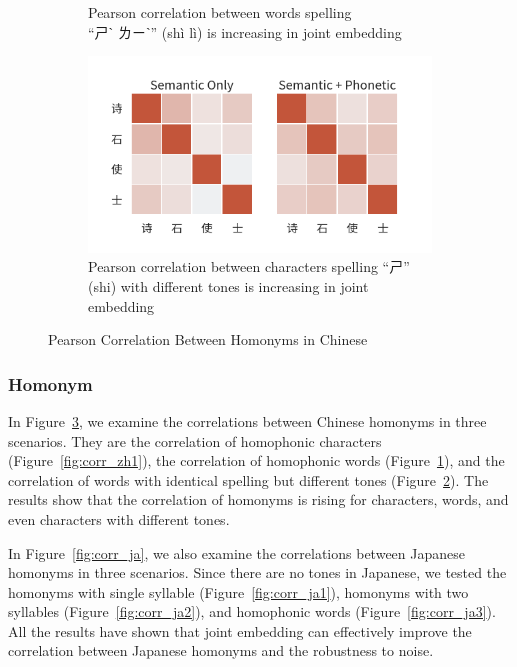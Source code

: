 \begin{figure}[t]
\begin{subfigure}[b]{0.49\textwidth}
        \caption{Pearson correlation between words spelling \\``ㄕˋ ㄌㄧˋ'' (shì lì) is increasing in joint embedding}
        \label{fig:corr_zh2}
    \end{subfigure}
    \begin{subfigure}[b]{0.49\textwidth}
        \centering
        \includegraphics[width=\textwidth]{../images/corr_zh3.png}
        \caption{Pearson correlation between characters spelling ``ㄕ'' (shi) with different tones is increasing in joint embedding}
        \label{fig:corr_zh3}
    \end{subfigure}
    \caption{Pearson Correlation Between Homonyms in Chinese}
    \label{fig:corr_zh}
\end{figure}

\subsubsection{Homonym}

In Figure~\ref{fig:corr_zh}, we examine the correlations between Chinese homonyms in three scenarios. They are the correlation of homophonic characters (Figure~\ref{fig:corr_zh1}), the correlation of homophonic words (Figure~\ref{fig:corr_zh2}), and the correlation of words with identical spelling but different tones (Figure~\ref{fig:corr_zh3}). The results show that the correlation of homonyms is rising for characters, words, and even characters with different tones. 

In Figure~\ref{fig:corr_ja}, we also examine the correlations between Japanese homonyms in three scenarios. Since there are no tones in Japanese, we tested the homonyms with single syllable (Figure~\ref{fig:corr_ja1}), homonyms with two syllables (Figure~\ref{fig:corr_ja2}), and homophonic words (Figure~\ref{fig:corr_ja3}). All the results have shown that joint embedding can effectively improve the correlation between Japanese homonyms and the robustness to noise.


